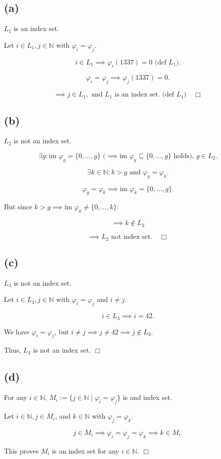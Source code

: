 


\subsection*{(a)}
$L_1$ is an index set.  

Let $i \in L_1, j \in \mathbb{N}$ with $\varphi_i = \varphi_j$.  

\[
i \in L_1 \implies \varphi_i(1337) = 0  \text{ (def } L_1).
\]

\[
\varphi_i = \varphi_j \implies \varphi_j(1337) = 0.
\]

\[
\implies j \in L_1, \text{ and } L_1 \text{ is an index set.}\text{ (def } L_1)  \quad \Box
\]

\subsection*{(b)}
$L_2$ is not an index set.

\[
\exists g: \text{im } \varphi_g = \{0, \ldots, g\} \text{ (}\implies \text{im } \varphi_g \subseteq \{0, \ldots, g\} \text{ holds), } g \in L_2.
\]

\[
\exists k \in \mathbb{N}: k > g \text{ and } \varphi_g = \varphi_k.
\]

\[
\varphi_g = \varphi_k \implies \text{im } \varphi_k = \{0, \ldots, g\}.
\]

But since $k > g \implies \text{im } \varphi_k \neq \{0, \ldots, k\}$:

\[
\implies k \notin L_2
\]

\[
\implies L_2 \text{ not index set.} \quad \Box
\]

\subsection*{(c)}
$L_3$ is not an index set.

Let $i \in L_3, j \in \mathbb{N}$ with $\varphi_i = \varphi_j$ and $i \neq j$.  

\[
i \in L_3 \implies i = 42.
\]

We have $\varphi_i = \varphi_j$, but $i \neq j \implies j \neq 42 \implies j \notin L_3$.  

Thus, $L_3$ is not an index set. \quad $\Box$

\subsection*{(d)}
For any $i \in \mathbb{N}$, $M_i := \{j \in \mathbb{N} \mid \varphi_i = \varphi_j\}$ is and index set.  

Let $i \in \mathbb{N}, j \in M_i$, and $k \in \mathbb{N}$ with $\varphi_j = \varphi_k$.  

\[
j \in M_i \implies \varphi_i = \varphi_j = \varphi_k \implies k \in M_i.
\]

This proves $M_i$ is an index set for any $i \in \mathbb{N}$. \quad $\Box$


